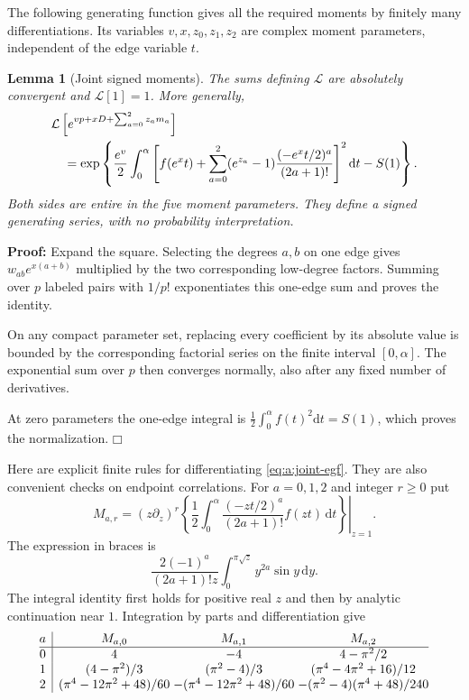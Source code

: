 \documentclass[a4paper,10pt]{article}
\numberwithin{equation}{section}
\newcommand{\dd}{\mathrm{d}}
\theoremstyle{paperplain}
\newtheorem{lmm}[thm]{Lemma}
\theoremstyle{paperremark}
\theoremstyle{paperplain}
\newenvironment{prf}{\noindent \textbf{Proof: }}{\hfill $\mdlgwhtsquare$\par\addvspace{0.5\baselineskip}}
\begin{document}
The following generating function gives all the required moments by
finitely many differentiations. Its variables $v,x,z_0,z_1,z_2$ are
complex moment parameters, independent of the edge variable $t$.

\begin{lmm}[Joint signed moments]\label{lmm:a:joint-moments}
The sums defining $\mathcal L$ are absolutely convergent and
$\mathcal L[1]=1$. More generally,
\begin{align}
 &\mathcal L\left[e^{vp+xD+\sum_{a=0}^2z_a m_a}\right]\notag\\
 &\quad=\exp\left\{\frac{e^v}{2}\int_0^\alpha
 \left[f(e^x t)+\sum_{a=0}^2(e^{z_a}-1)
               \frac{(-e^x t/2)^a}{(2a+1)!}\right]^2\dd t-S(1)\right\}.
 \label{eq:a:joint-egf}
\end{align}
Both sides are entire in the five moment parameters. They define a
signed generating series, with no probability interpretation.
\end{lmm}
\begin{prf}
Expand the square. Selecting the degrees $a,b$ on one edge gives
$w_{ab}e^{x(a+b)}$ multiplied by the two corresponding low-degree
factors. Summing over $p$ labeled pairs with $1/p!$ exponentiates
this one-edge sum and proves the identity.

On any compact parameter
set, replacing every coefficient by its absolute value is bounded by
the corresponding factorial series on the finite interval
$[0,\alpha]$. The exponential sum over $p$ then converges normally,
also after any fixed number of derivatives.

At zero parameters the
one-edge integral is $\tfrac12\int_0^\alpha f(t)^2\dd t=S(1)$,
which proves the normalization.
\end{prf}

Here are explicit finite rules for differentiating
\eqref{eq:a:joint-egf}. They are also convenient checks on endpoint
correlations. For $a=0,1,2$ and integer $r\geq0$ put
\begin{equation}\label{eq:a:side-moments}
 M_{a,r}=\left.(z\partial_z)^r
 \left\{\frac12\int_0^\alpha
       \frac{(-zt/2)^a}{(2a+1)!}f(zt)\,\dd t\right\}\right|_{z=1}.
\end{equation}
The expression in braces is
\[
 \frac{2(-1)^a}{(2a+1)!z}
              \int_0^{\pi\sqrt z}y^{2a}\sin y\,\dd y.
\]
The integral identity first holds for positive real $z$ and then by
analytic continuation near $1$. Integration by parts and differentiation
give
\begin{equation}\label{eq:a:side-table}
\begin{array}{@{}c|c@{\;}c@{\;}c@{}}
 a&M_{a,0}&M_{a,1}&M_{a,2}\\\hline
0&4&-4&4-\pi^2/2\\
1&(4-\pi^2)/3&(\pi^2-4)/3&(\pi^4-4\pi^2+16)/12\\
2&(\pi^4-12\pi^2+48)/60&-(\pi^4-12\pi^2+48)/60
 &-(\pi^2-4)(\pi^4+48)/240
\end{array}
\end{equation}
\end{document}
